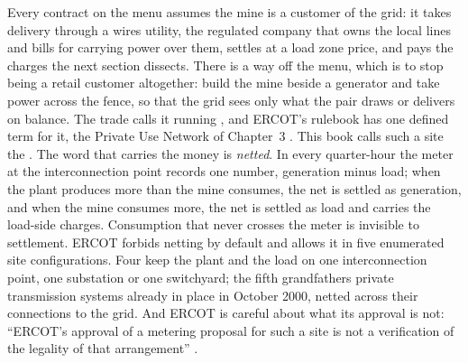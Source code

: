 Every contract on the menu assumes the mine is a customer of the grid: it takes delivery through a wires utility, the regulated company that owns the local lines and bills for carrying power over them, settles at a load zone price, and pays the charges the next section dissects. There is a way off the menu, which is to stop being a retail customer altogether: build the mine beside a generator and take power across the fence, so that the grid sees only what the pair draws or delivers on balance. The trade calls it running , and ERCOT's rulebook has one defined term for it, the Private Use Network of Chapter~3 \autocite{ercot2026protocols}. This book calls such a site the . %
The word that carries the money is \emph{netted}. In every quarter-hour the meter at the interconnection point records one number, generation minus load; when the plant produces more than the mine consumes, the net is settled as generation, and when the mine consumes more, the net is settled as load and carries the load-side charges. Consumption that never crosses the meter is invisible to settlement. %
ERCOT forbids netting by default and allows it in five enumerated site configurations. Four keep the plant and the load on one interconnection point, one substation or one switchyard; the fifth grandfathers private transmission systems already in place in October 2000, netted across their connections to the grid. And ERCOT is careful about what its approval is not: ``ERCOT's approval of a metering proposal for such a site is not a verification of the legality of that arrangement'' \autocite{ercot2026protocols}. %
